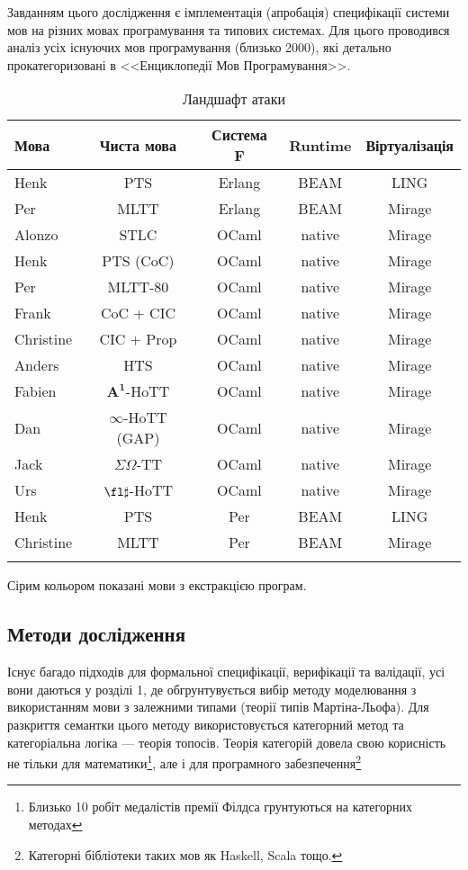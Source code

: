 Завданням цього дослідження є імплементація (апробація)
специфікації системи мов на різних мовах програмування та типових системах.
Для цього проводився аналіз усіх існуючих мов
програмування (близько 2000), які детально прокатегоризовані
в <<Енциклопедії Мов Програмування>>.

\begin{table}[ht]
 \caption{Ландшафт атаки}
  \begin{tabular}{lcccc}
   \hline
\rowcolor{ZimaBlue}
       \textbf{Мова} & \textbf{Чиста мова} & \textbf{Система F} & \textbf{Runtime} & \textbf{Віртуалізація} \\
   \hline
 Henk              & PTS         & Erlang  & BEAM   & LING \\
 Per               & MLTT      & Erlang  & BEAM   & Mirage \\
   \hline
 Alonzo            & STLC       & OCaml   & native & Mirage \\
 Henk              & PTS (CoC)  & OCaml   & native & Mirage \\
 Per               & MLTT-80    & OCaml   & native & Mirage \\
 Frank             & CoC + CIC  & OCaml   & native & Mirage \\
 Christine         & CIC + Prop & OCaml   & native & Mirage \\
 Anders            & HTS        & OCaml   & native & Mirage \\
 Fabien            & $\mathbf{A^1}$-HoTT       & OCaml   & native & Mirage \\
 Dan               & $\infty$-HoTT (GAP) & OCaml   & native & Mirage \\
 Jack              & $\Sigma\Omega$-TT       & OCaml   & native & Mirage \\
 Urs               & $\fl\sharp$-HoTT   & OCaml   & native & Mirage \\
   \hline
    \rowcolor{LightGray}
 Henk              & PTS        & Per     & BEAM   & LING \\
    \rowcolor{LightGray}
 Christine         & MLTT       & Per     & BEAM   & Mirage \\
    \rowcolor{LightGray}
    \hline
  \end{tabular}
  \small Сірим кольором показані мови з екстракцією програм.
\end{table}

\newpage
\subsection{Методи дослідження}
Існує багадо підходів для формальної специфікації,
верифікації та валідації, усі вони даються у розділі 1, де
обгрунтувується вибір методу моделювання з використанням
мови з залежними типами (теорії типів Мартіна-Льофа).
Для разкриття семантки цього методу використовується
категорний метод та категоріальна логіка --- теорія топосів.
Теорія категорій довела свою корисність не тільки для
математики\footnote{Близько 10 робіт медалістів премії
Філдса грунтуються на категорних методах},
але і для програмного
забезпечення\footnote{Категорні бібліотеки таких мов як Haskell, Scala тощо.}

